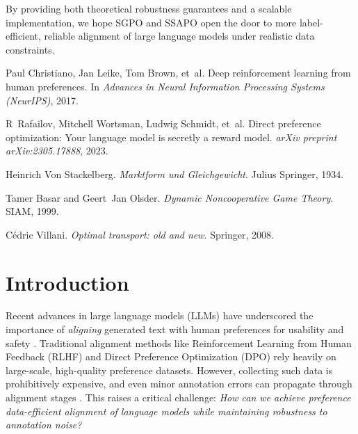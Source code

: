 By providing both theoretical robustness guarantees and a scalable implementation, we hope SGPO and SSAPO open the door to more label-efficient, reliable alignment of large language models under realistic data constraints.


\begin{thebibliography}{9}

Paul Christiano, Jan Leike, Tom Brown, et~al.
\newblock Deep reinforcement learning from human preferences.
\newblock In \emph{Advances in Neural Information Processing Systems (NeurIPS)}, 2017.

R~Rafailov, Mitchell Wortsman, Ludwig Schmidt, et~al.
\newblock Direct preference optimization: Your language model is secretly a reward model.
\newblock \emph{arXiv preprint arXiv:2305.17888}, 2023.

Heinrich Von Stackelberg.
\newblock \emph{Marktform und Gleichgewicht}.
\newblock Julius Springer, 1934.

Tamer Basar and Geert~Jan Olsder.
\newblock \emph{Dynamic Noncooperative Game Theory}.
\newblock SIAM, 1999.

Cédric Villani.
\newblock \emph{Optimal transport: old and new}.
\newblock Springer, 2008.

\end{thebibliography}


\section{Introduction}
\label{sec:intro}
Recent advances in large language models (LLMs) have underscored the importance of \emph{aligning} generated text with human preferences for usability and safety \citep{Ouyang2022Training, Bai2022Training}. Traditional alignment methods like Reinforcement Learning from Human Feedback (RLHF) \citep{Christiano2017Deep} and Direct Preference Optimization (DPO) \citep{Rafailov2024Direct} rely heavily on large-scale, high-quality preference datasets. However, collecting such data is prohibitively expensive, and even minor annotation errors can propagate through alignment stages \citep{Casper2023Open}. This raises a critical challenge: \emph{How can we achieve preference data-efficient alignment of language models while maintaining robustness to annotation noise?}

